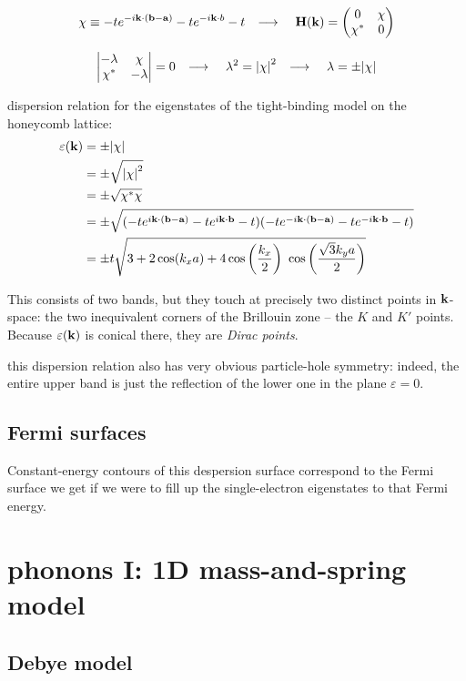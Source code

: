 \documentclass[10pt, a4paper, twocolumn]{article}
\newcommand{\arr}{\ensuremath{\longrightarrow\ }}
\begin{document}
\[\chi \equiv -te^{-i\vb k\cdot (\vb b-\vb a)}
-te^{-i\vb k\cdot b} - t
\qq{\arr} \vb H(\vb k)=\pmqty{0&\chi\\ \chi ^*&0} \]

\[\vmqty{-\lambda &\chi \\ \chi ^*&-\lambda}
=0\qq{\arr} \lambda ^2 = \abs{\chi}^2
\qq{\arr} \lambda = \pm \abs{\chi} \]

dispersion relation for the eigenstates of the tight-binding model on the honeycomb lattice:
\begin{equation*}
\begin{aligned}
\varepsilon (\vb k) &= \pm \abs{\chi}
\\&= \pm \sqrt{\abs{\chi}^2}
\\&=\pm \sqrt{\chi ^* \chi}
\\&=\pm \sqrt{
(-te^{i\vb k\cdot (\vb b-\vb a)}
-te^{i\vb k \cdot \vb b} -t)
(-te^{-i\vb k\cdot (\vb b-\vb a)}
-te^{-i\vb k \cdot \vb b} -t)}
\\&= \pm t \sqrt{
3+2\cos (k_xa)+4\cos \qty(\frac{k_x}{2})
\ \cos \qty(\frac{\sqrt 3k_ya}{2})}
\end{aligned}
\end{equation*}

This consists of two bands, but they touch at precisely two distinct points in $\vb k$-space: the two inequivalent corners of the Brillouin zone -- the $K$ and $K'$ points. Because $\varepsilon (\vb k)$ is conical there, they are \emph{Dirac points}.

this dispersion relation also has very obvious particle-hole symmetry: indeed, the entire upper band is just the reflection of the lower one  in the plane $\varepsilon =0$.

\subsection{Fermi surfaces}

Constant-energy contours of this despersion surface correspond to the Fermi surface we get if we were to fill up the single-electron eigenstates to that Fermi energy.

\section{phonons I: 1D mass-and-spring model}

\subsection{Debye model}
\end{document}
